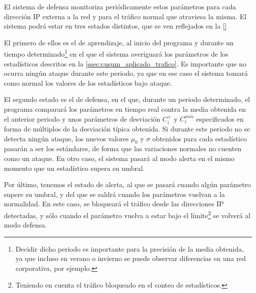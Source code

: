 El sistema de defensa \redborderddos monitoriza periódicamente estos parámetros
para cada dirección IP externa a la red y para el tráfico normal que atraviesa
la misma. El sistema podrá estar en tres estados distintos, que se ven reflejados
en la \autoref{}

El primero de ellos es el de aprendizaje, al
inicio del programa y durante un tiempo determinado\footnote{Decidir dicho
periodo es importante para la precisión de la media obtenida, ya que incluso en
verano o invierno se puede observar diferencias en una red corporativa, por ejemplo.}
en el que el sistema averiguará los parámetros de los estadísticos descritos en la 
\autoref{ssec:cusum_aplicado_trafico}. Es importante que no ocurra ningún
ataque durante este periodo, ya que en ese caso el sistema tomará como normal
los valores de los estadísticos bajo ataque.

El segundo estado es el de defensa, en el que, durante un periodo determinado, el programa comparará
los parámetros en tiempo real contra la media obtenida en el anterior periodo y
unos parámetros de desviación $C_i^+$ y $C_i^{min}$ especificados en forma de múltiplos
de la desviación típica obtenida. Si durante este periodo no se detecta ningún ataque, los nuevos
valores $\mu_0$ y $\sigma$ obtenidos para cada estadístico pasarán a ser los estándares, de
forma que las variaciones normales no cuenten como un ataque. En otro
caso, el sistema pasará al modo alerta en el mismo momento que un estadístico supera su umbral.

Por último, tenemos el estado de alerta, al que se pasará cuando algún parámetro supere su umbral, y del que se
saldrá cuando los parámetros vuelvan a la normalidad. En este caso, se bloqueará el tráfico desde
las direcciones IP detectadas, y sólo cuando el parámetro vuelva a estar bajo el límite\footnote{Teniendo
en cuenta el tráfico bloqueado en el conteo de estadísticos.} se volverá al modo defensa.

\endinput
